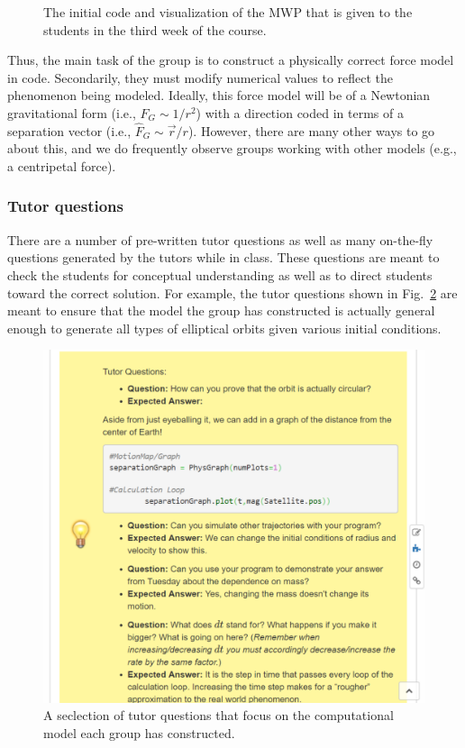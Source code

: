 \documentclass{msuphddissertation}
\begin{document}
\begin{doublespace}
\begin{figure}[ht]
\caption{The initial code and visualization of the MWP that is given to the students in the third week of the course.}\label{CH3:InitialCodeVisual}
\end{figure}

Thus, the main task of the group is to construct a physically correct force model in code.  Secondarily, they must modify numerical values to reflect the phenomenon being modeled.  Ideally, this force model will be of a Newtonian gravitational form (i.e., $F_{G}\sim1/r^{2}$) with a direction coded in terms of a separation vector (i.e., $\hat{F}_{G}\sim\vec{r}/r$).  However, there are many other ways to go about this, and we do frequently observe groups working with other models (e.g., a centripetal force).

\subsubsection{Tutor questions}\label{CH3:TutorQuestions}

There are a number of pre-written tutor questions as well as many on-the-fly questions generated by the tutors while in class.  These questions are meant to check the students for conceptual understanding as well as to direct students toward the correct solution.  For example, the tutor questions shown in Fig.~\ref{CH3:TutorQuestion} are meant to ensure that the model the group has constructed is actually general enough to generate all types of elliptical orbits given various initial conditions.

\begin{figure}[ht]\centering
\includegraphics[scale=0.5]{images/CH3TutorQuestion.pdf}
\caption{A seclection of tutor questions that focus on the computational model each group has constructed.}\label{CH3:TutorQuestion}
\end{figure}


\end{doublespace}
\end{document}
